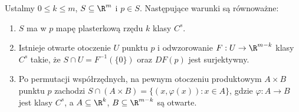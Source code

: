 \begin{twierdzenie}
\label{ma2:thm:submanifold-descriptions}
Ustalmy $0\le k\le m$, $S\subseteq\R^m$ i $p\in S$.
Następujące warunki są równoważne:
\begin{enumerate}
\item $S$ ma w $p$ mapę plasterkową rzędu $k$ klasy $C^s$.
\item Istnieje otwarte otoczenie $U$ punktu $p$
i odwzorowanie $F:U\to\R^{m-k}$ klasy $C^s$ takie, że
$S\cap U=F^{-1}(\{0\})$ oraz $DF(p)$ jest surjektywny.
\item Po permutacji współrzędnych, na pewnym otoczeniu
produktowym $A\times B$ punktu $p$ zachodzi
$S\cap(A\times B)=\{(x,\varphi(x)):x\in A\}$,
gdzie $\varphi:A\to B$ jest klasy $C^s$, a
$A\subseteq\R^k$, $B\subseteq\R^{m-k}$ są otwarte.
\end{enumerate}
\end{twierdzenie}
